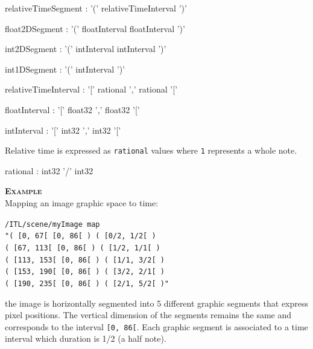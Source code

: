 \documentclass[a4paper,twoside]{report}
\newcommand{\OSC}[1]		{\texttt{#1}}
\newcommand{\values}[1]	{\texttt{#1}}
\newcommand{\example}		{\textbf{\hspace{-1.5cm}\textbf{\textsc{Example }}}}
\newcommand{\sample}	[1]			{\vspace{-2mm}\begin{center}\colorbox{mygrey}{
								\begin{minipage}[t]{0.9\columnwidth} 
								{\small \texttt{#1}}
								\end{minipage}}\end{center}}
\begin{document}
\begin{rail}
relativeTimeSegment : '(' relativeTimeInterval ')' 
\end{rail}
\begin{rail}
float2DSegment : '(' floatInterval floatInterval ')' 
\end{rail}
\begin{rail}
int2DSegment : '(' intInterval intInterval ')' 
\end{rail}
\begin{rail}
int1DSegment : '(' intInterval ')' 
\end{rail}


\begin{rail}
relativeTimeInterval : '[' rational ',' rational '[' 
\end{rail}
\begin{rail}
floatInterval : '[' float32 ',' float32 '['
\end{rail}
\begin{rail}
intInterval : '[' int32 ',' int32 '['
\end{rail}

Relative time is expressed as \OSC{rational} values where \values{1} represents a whole note.

\begin{rail}
rational : int32 '/' int32
\end{rail}

\example \\
Mapping an image graphic space to time:
\sample{/ITL/scene/myImage map \\
\hspace*{1cm}"( [0, 67[    [0, 86[ ) ( [0/2, 1/2[ ) \\
\hspace*{1.15cm}( [67, 113[  [0, 86[ ) ( [1/2, 1/1[ ) \\
\hspace*{1.15cm}( [113, 153[ [0, 86[ ) ( [1/1, 3/2[ ) \\
\hspace*{1.15cm}( [153, 190[ [0, 86[ ) ( [3/2, 2/1[ ) \\
\hspace*{1.15cm}( [190, 235[ [0, 86[ ) ( [2/1, 5/2[ )"
}
the image is horizontally segmented into 5 different graphic segments that express pixel positions. The vertical dimension of the segments remains the same and corresponds to the interval \values{[0, 86[}. Each graphic segment is associated to a time interval which duration is 1/2 (a half note).
\end{document}
